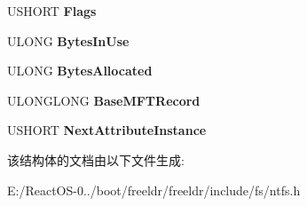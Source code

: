 \begin{DoxyCompactItemize}
U\+S\+H\+O\+RT {\bfseries Flags}
\item 
\mbox{\label{struct_n_t_f_s___m_f_t___r_e_c_o_r_d_af7ea25d1913f796c13ddbd82248f7d4e}} 
U\+L\+O\+NG {\bfseries Bytes\+In\+Use}
\item 
\mbox{\label{struct_n_t_f_s___m_f_t___r_e_c_o_r_d_a46946ff3868e86933f682caf753a0f97}} 
U\+L\+O\+NG {\bfseries Bytes\+Allocated}
\item 
\mbox{\label{struct_n_t_f_s___m_f_t___r_e_c_o_r_d_ae676ef06aef9a6168fb495588d345c78}} 
U\+L\+O\+N\+G\+L\+O\+NG {\bfseries Base\+M\+F\+T\+Record}
\item 
\mbox{\label{struct_n_t_f_s___m_f_t___r_e_c_o_r_d_a21636e0e420adcb48c99f0d7335e912f}} 
U\+S\+H\+O\+RT {\bfseries Next\+Attribute\+Instance}
\end{DoxyCompactItemize}


该结构体的文档由以下文件生成\+:\begin{DoxyCompactItemize}
\item 
E\+:/\+React\+O\+S-\/0../boot/freeldr/freeldr/include/fs/ntfs.\+h\end{DoxyCompactItemize}
